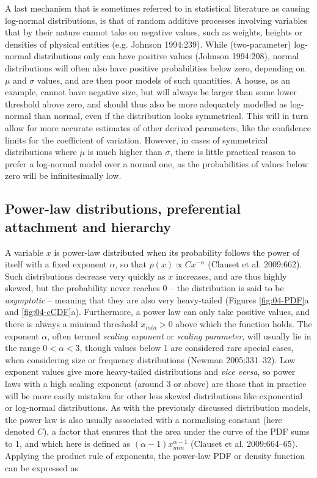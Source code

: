 \documentclass[
  12pt,
]{book}
\begin{document}
A last mechanism that is sometimes referred to in statistical literature as causing log-normal distributions, is that of random additive processes involving variables that by their nature cannot take on negative values, such as weights, heights or densities of physical entities (e.g. Johnson 1994:239). While (two-parameter) log-normal distributions only can have positive values (Johnson 1994:208), normal distributions will often also have positive probabilities below zero, depending on \(\mu\) and \(\sigma\) values, and are then poor models of such quantities. A house, as an example, cannot have negative size, but will always be larger than some lower threshold above zero, and should thus also be more adequately modelled as log-normal than normal, even if the distribution looks symmetrical. This will in turn allow for more accurate estimates of other derived parameters, like the confidence limits for the coefficient of variation. However, in cases of symmetrical distributions where \(\mu\) is much higher than \(\sigma\), there is little practical reason to prefer a log-normal model over a normal one, as the probabilities of values below zero will be infinitesimally low.

\FloatBarrier

\hypertarget{power-law-distributions-preferential-attachment-and-hierarchy}{%
\subsection{Power-law distributions, preferential attachment and hierarchy}\label{power-law-distributions-preferential-attachment-and-hierarchy}}

A variable \(x\) is power-law distributed when its probability follows the power of itself with a fixed exponent \(\alpha\), so that \(p(x) \propto Cx^{-\alpha}\) (Clauset et al. 2009:662). Such distributions decrease very quickly as \(x\) increases, and are thus highly skewed, but the probability never reaches 0 -- the distribution is said to be \emph{asymptotic} -- meaning that they are also very heavy-tailed (Figures \ref{fig:04-PDF}a and \ref{fig:04-cCDF}a). Furthermore, a power law can only take positive values, and there is always a minimal threshold \(x_{min} > 0\) above which the function holds. The exponent \(\alpha\), often termed \emph{scaling exponent} or \emph{scaling parameter}, will usually lie in the range \(0 < \alpha < 3\), though values below 1 are considered rare special cases, when considering size or frequency distributions (Newman 2005:331--32). Low exponent values give more heavy-tailed distributions and \emph{vice versa}, so power laws with a high scaling exponent (around 3 or above) are those that in practice will be more easily mistaken for other less skewed distributions like exponential or log-normal distributions. As with the previously discussed distribution models, the power law is also usually associated with a normalising constant (here denoted \(C\)), a factor that ensures that the area under the curve of the PDF sums to 1, and which here is defined as \((\alpha-1)x_{min}^{\alpha-1}\) (Clauset et al. 2009:664--65). Applying the product rule of exponents, the power-law PDF or density function can be expressed as
\end{document}
